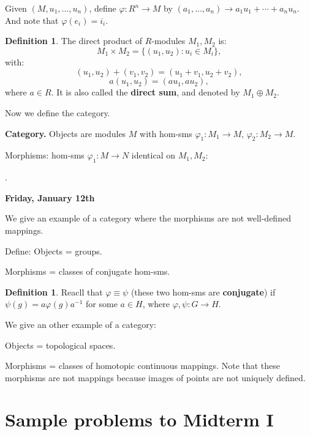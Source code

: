 \documentclass[12pt]{amsbook}
\theoremstyle{plain}
\numberwithin{section}{chapter}
\numberwithin{equation}{chapter}
\theoremstyle{definition}
\newtheorem{Def}[theorem]{Definition}
\theoremstyle{remark}
\renewcommand{\phi}{\varphi}
\begin{document}
Given $(M,u_1,...,u_n)$, define $\phi:R^n \to M$ by $(a_1,...,a_n) \to a_1u_1 + \cdots + a_nu_n$. And note that $\phi(e_i) = i_i$. 

\begin{Def}
The direct product of $R$-modules $M_1,M_2$ is:
 $$
M_1\times M_2 = \{(u_1,u_2):u_i \in M_i\},
$$
with:
$$
(u_1,u_2) + (v_1,v_2) = (u_1 + v_1, u_2 + v_2),
$$
$$
a(u_1,u_2) = (au_1,au_2),
$$
where $a \in R$. It is also called the \textbf{direct sum}, and denoted by $M_1 \oplus M_2$. 
\end{Def}

Now we define the category. 

\textbf{Category.} Objects are modules $M$ with hom-sms $\phi_1:M_1 \to M$, $\phi_2:M_2 \to M$. 

Morphisms: hom-sms $\phi_1:M \to N$ identical on $M_1,M_2$:

\begin{center}
. 
\end{center}







\textbf{Friday, January 12th}


We give an example of a category where the morphisms are not well-defined mappings. 

Define:
Objects = groups. 

Morphisms = classes of conjugate hom-sms. 

\begin{Def}
Reacll that $\phi \equiv \psi$ (these two hom-sms are \textbf{conjugate}) if $\psi(g) = a\phi(g)a^{-1}$ for some $a \in H$, where $\phi,\psi:G \to H$. 
\end{Def}

We give an other example of a category: 

Objects = topological spaces. 

Morphisms = classes of homotopic continuous mappings. Note that these morphisms are not mappings because images of points are not uniquely defined. 


\chapter{Sample problems to Midterm I}
\end{document}
